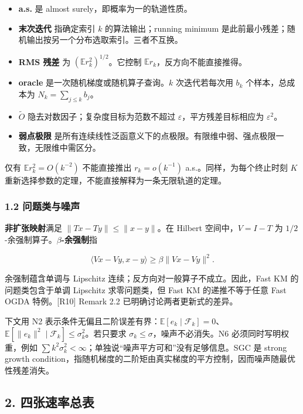\documentclass[
  chinese,
  10pt,
  a4paper,
]{article}
\providecommand{\tightlist}{%
  \setlength{\itemsep}{0pt}\setlength{\parskip}{0pt}}
\begin{document}
\begin{itemize}
\tightlist
\item
  \textbf{a.s.} 是 almost surely，即概率为一的轨道性质。
\item
  \textbf{末次迭代} 指确定索引 \(k\) 的算法输出；running minimum
  是此前最小残差；随机输出按另一个分布选取索引。三者不互换。
\item
  \textbf{RMS 残差} 为 \((\mathbb E r_k^2)^{1/2}\)。它控制
  \(\mathbb E r_k\)，反方向不能直接推得。
\item
  \textbf{oracle} 是一次随机梯度或随机算子查询。\(k\) 次迭代若每次用
  \(b_k\) 个样本，总成本为 \(N_k=\sum_{j\le k}b_j\)。
\item
  \(\widetilde O\) 隐去对数因子；复杂度目标为范数不超过
  \(\varepsilon\)，平方残差目标相应为 \(\varepsilon^2\)。
\item
  \textbf{弱点极限}
  是所有连续线性泛函意义下的点极限。有限维中弱、强点极限一致，无限维中需区分。
\end{itemize}

仅有 \(\mathbb E r_k^2=O(k^{-2})\) 不能直接推出 \(r_k=o(k^{-1})\)
a.s.。同样，为每个终止时刻 \(K\)
重新选择参数的定理，不能直接解释为一条无限轨道的定理。

\subsubsection{1.2
问题类与噪声}\label{ux95eeux9898ux7c7bux4e0eux566aux58f0}

\textbf{非扩张映射}满足 \(\lVert Tx-Ty\rVert\le\lVert x-y\rVert\)。在
Hilbert 空间中，\(V=I-T\) 为
\(1/2\)-余强制算子。\textbf{\(\beta\)-余强制}指

\[
\langle Vx-Vy,x-y\rangle\ge\beta\lVert Vx-Vy\rVert^2.
\]

余强制蕴含单调与 Lipschitz 连续；反方向对一般算子不成立。因此，Fast KM
的问题类包含于单调 Lipschitz 求零问题类，但 Fast KM 的递推不等于任意
Fast OGDA 特例。{[}R10{]} Remark 2.2 已明确讨论两者更新式的差异。

下文用 N2
表示条件无偏且二阶误差有界：\(\mathbb E[e_k\mid\mathcal F_k]=0\)、\(\mathbb E[\lVert e_k\rVert^2\mid\mathcal F_k]\le\sigma_k^2\)。若只要求
\(\sigma_k\le\sigma\)，噪声不必消失。N6 必须同时写明权重，例如
\(\sum k^2\sigma_k^2<\infty\)；单独说``噪声平方可和''没有足够信息。SGC
是 strong growth
condition，指随机梯度的二阶矩由真实梯度的平方控制，因而噪声随最优性残差消失。

\subsection{2. 四张速率总表}\label{ux56dbux5f20ux901fux7387ux603bux8868}
\end{document}
